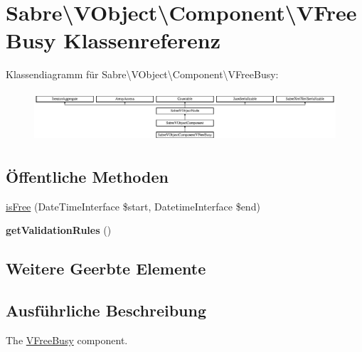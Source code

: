 \hypertarget{class_sabre_1_1_v_object_1_1_component_1_1_v_free_busy}{}\section{Sabre\textbackslash{}V\+Object\textbackslash{}Component\textbackslash{}V\+Free\+Busy Klassenreferenz}
\label{class_sabre_1_1_v_object_1_1_component_1_1_v_free_busy}
Klassendiagramm für Sabre\textbackslash{}V\+Object\textbackslash{}Component\textbackslash{}V\+Free\+Busy\+:\begin{figure}[H]
\begin{center}
\leavevmode
\includegraphics[height=1.874477cm]{class_sabre_1_1_v_object_1_1_component_1_1_v_free_busy}
\end{center}
\end{figure}
\subsection*{Öffentliche Methoden}
\begin{DoxyCompactItemize}
\item 
\mbox{\hyperlink{class_sabre_1_1_v_object_1_1_component_1_1_v_free_busy_a4782d182f4333c355690e03a567655a8}{is\+Free}} (Date\+Time\+Interface \$start, Datetime\+Interface \$end)
\item 
\mbox{\label{class_sabre_1_1_v_object_1_1_component_1_1_v_free_busy_a3d0343f0ee7cf0b6d80f8d80725dbaad}} 
{\bfseries get\+Validation\+Rules} ()
\end{DoxyCompactItemize}
\subsection*{Weitere Geerbte Elemente}


\subsection{Ausführliche Beschreibung}
The \mbox{\hyperlink{class_sabre_1_1_v_object_1_1_component_1_1_v_free_busy}{V\+Free\+Busy}} component.

